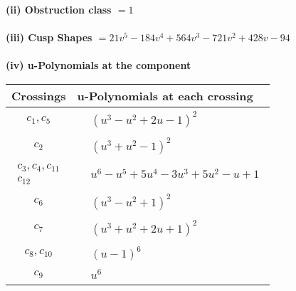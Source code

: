 \documentclass[1p]{elsarticle_modified}
\theoremstyle{definition}
\begin{document}
\flushleft \textbf{(ii) Obstruction class $= 1$}\\~\\
\flushleft \textbf{(iii) Cusp Shapes $= 21 v^5-184 v^4+564 v^3-721 v^2+428 v-94$}\\~\\
\newpage\renewcommand{\arraystretch}{1}
\flushleft \textbf{(iv) u-Polynomials at the component}\newline \\
\begin{tabular}{m{50pt}|m{274pt}}
Crossings & \hspace{64pt}u-Polynomials at each crossing \\
\hline $$\begin{aligned}c_{1},c_{5}\end{aligned}$$&$\begin{aligned}
&(u^3- u^2+2 u-1)^2
\end{aligned}$\\
\hline $$\begin{aligned}c_{2}\end{aligned}$$&$\begin{aligned}
&(u^3+u^2-1)^2
\end{aligned}$\\
\hline $$\begin{aligned}c_{3},c_{4},c_{11}\\c_{12}\end{aligned}$$&$\begin{aligned}
&u^6- u^5+5 u^4-3 u^3+5 u^2- u+1
\end{aligned}$\\
\hline $$\begin{aligned}c_{6}\end{aligned}$$&$\begin{aligned}
&(u^3- u^2+1)^2
\end{aligned}$\\
\hline $$\begin{aligned}c_{7}\end{aligned}$$&$\begin{aligned}
&(u^3+u^2+2 u+1)^2
\end{aligned}$\\
\hline $$\begin{aligned}c_{8},c_{10}\end{aligned}$$&$\begin{aligned}
&(u-1)^6
\end{aligned}$\\
\hline $$\begin{aligned}c_{9}\end{aligned}$$&$\begin{aligned}
&u^6
\end{aligned}$\\
\hline
\end{tabular}\\~\\
\end{document}
